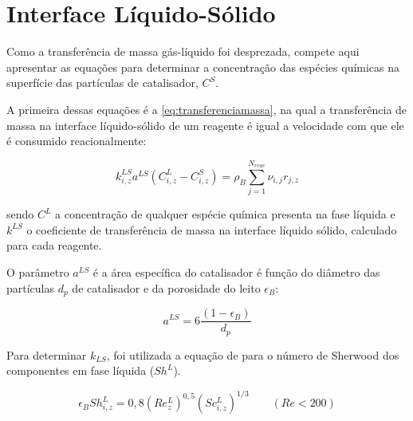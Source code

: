 
\section{Interface Líquido-Sólido} \label{sec:interfaceliquidosolido}

Como a transferência de massa gás-líquido foi desprezada, compete aqui
apresentar as equações para determinar a concentração das espécies químicas
na superfície das partículas de catalisador, $C^S$. 

A primeira dessas equações é a \autoref{eq:transferenciamassa}, na qual a
transferência de massa na interface líquido-sólido de um reagente é igual a
velocidade com que ele é consumido reacionalmente:

\begin{equation}
k_{i,z}^{LS}a^{LS}(C^L_{i,z}-C^S_{i,z}) = \rho_B
\displaystyle\sum_{j=1}^{N_{reac}}
\nu_{i,j}r_{j,z}
\label{eq:transferenciamassa}
\end{equation}

sendo $C^{L}$ a concentração de qualquer espécie química presenta na fase
líquida e $k^{LS}$ o coeficiente de transferência de massa na interface líquido
sólido, calculado para cada reagente.


O parâmetro $a^{LS}$ é a área específica do catalisador é função do diâmetro das
partículas $d_p$ de catalisador e da porosidade do leito $\epsilon_B$:

\begin{equation}
a^{LS} = 6 \dfrac{(1-\epsilon_B)}{d_p}
\label{eq:aLS}
\end{equation}


Para determinar $k_{LS}$, foi utilizada a equação de 
para o número de Sherwood dos componentes em fase líquida ($Sh^L$).

\begin{equation}
\epsilon_BSh^L_{i,z} = 0,8(Re^L_z)^{0,5}(Sc^L_{i,z})^{1/3} \qquad (Re<200)
\label{eq:Sh1}
\end{equation}


